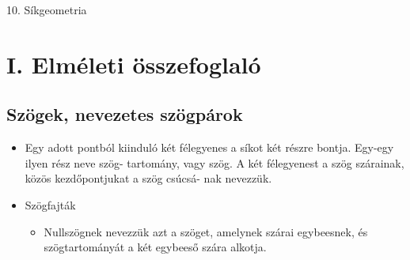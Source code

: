 \documentclass[a4paper,12pt]{article}
\begin{document}
\begin{center}
\begin{huge}
10. Síkgeometria
\end{huge}
\end{center}
\section*{I. Elméleti összefoglaló}
\subsection*{Szögek, nevezetes szögpárok}
\begin{itemize}
\item Egy adott pontból kiinduló két félegyenes a síkot két részre bontja. Egy-egy ilyen rész neve szög-
tartomány, vagy szög. A két félegyenest a szög szárainak, közös kezdőpontjukat a szög csúcsá-
nak nevezzük.
\end{itemize}
\begin{itemize}
\item Szögfajták
\begin{itemize}[label=$\circ$]
\item Nullszögnek nevezzük azt a szöget, amelynek szárai egybeesnek, és szögtartományát a két
egybeeső szára alkotja.
\end{itemize}
\end{itemize}
\end{document}
